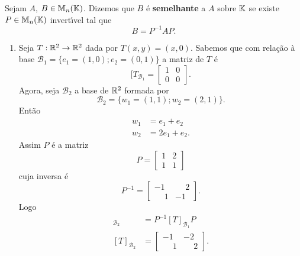 \begin{definicao}
  Sejam $A$, $B \in \mathbb{M}_n(\mathbb{K})$. Dizemos que $B$ \'e \textbf{semelhante} a $A$ sobre $\mathbb{K}$ se existe $P \in \mathbb{M}_n(\mathbb{K})$ invert{\'\i}vel tal que
  \[
    B = P^{-1}AP.
  \]
\end{definicao}

\begin{exemplos}
  \begin{enumerate}[label={\arabic*})]
    \item Seja $T : \mathbb{R}^2 \to \mathbb{R}^2$ dada por $T(x,y) = (x,0)$. Sabemos que com rela\c{c}\~ao \`a base $\mathcal{B}_1 = \{e_1=(1,0);e_2=(0,1)\}$ a matriz de $T$ \'e
    \[
      [T_{\mathcal{B}_1} = \begin{bmatrix}
        1 & 0\\
        0 & 0
      \end{bmatrix}.
    \]
    Agora, seja $\mathcal{B}_2$ a base de $\mathbb{R}^2$ formada por
    \[
      \mathcal{B}_2 = \{w_1 = (1,1);w_2=(2,1)\}.
    \]
    Ent\~ao
    \begin{align*}
      w_1 &= e_1 + e_2\\
      w_2 &= 2e_1 + e_2.
    \end{align*}
    Assim $P$ \'e a matriz
    \[
      P = \begin{bmatrix}
        1 & 2\\
        1 & 1
      \end{bmatrix}
    \]
    cuja inversa \'e
    \[
      P^{-1} = \begin{bmatrix}
        -1 & \phantom{-}2\\
        \phantom{-}1 & -1
      \end{bmatrix}.
    \]
    Logo
    \begin{align*}
      [T]_{\mathcal{B}_2} &= P^{-1}[T]_{\mathcal{B}_1}P\\
      [T]_{\mathcal{B}_2} &= \begin{bmatrix}
        -1 & -2\\
        \phantom{-}1 & \phantom{-}2
      \end{bmatrix}.
    \end{align*}


\end{enumerate}
\end{exemplos}
